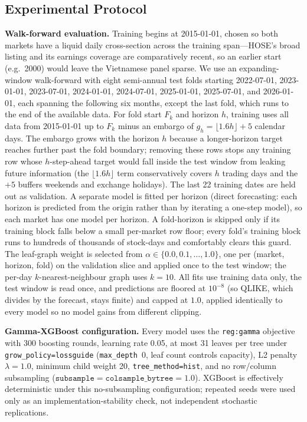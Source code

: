 \documentclass[runningheads,a4paper]{llncs}
\begin{document}
\subsection{Experimental Protocol}
\textbf{Walk-forward evaluation.} Training begins at 2015-01-01, chosen so both markets have a liquid daily
cross-section across the training span---HOSE's broad listing and its earnings coverage are comparatively
recent, so an earlier start (e.g.\ 2000) would leave the Vietnamese panel sparse. We use an expanding-window walk-forward
with eight semi-annual test folds starting 2022-07-01, 2023-01-01, 2023-07-01, 2024-01-01, 2024-07-01,
2025-01-01, 2025-07-01, and 2026-01-01, each spanning the following six months, except the last fold, which runs to the end of the available data. For fold start $F_k$ and
horizon $h$, training uses all data from 2015-01-01 up to $F_k$ minus an embargo of
$g_h=\lfloor 1.6h\rfloor+5$ calendar days. The embargo grows with the horizon $h$ because a longer-horizon
target reaches further past the fold boundary; removing these rows stops any training row whose
$h$-step-ahead target would fall inside the test window from leaking future information (the
$\lfloor 1.6h\rfloor$ term conservatively covers $h$ trading days and the $+5$ buffers weekends and exchange
holidays). The last 22 training dates are held out as validation. A
separate model is fitted per horizon (direct forecasting: each horizon is predicted from the origin
rather than by iterating a one-step model), so each market has one model per horizon. A fold-horizon is
skipped only if its training block falls below a small per-market row floor; every fold's training block
runs to hundreds of thousands of stock-days and comfortably clears this guard. The leaf-graph weight is selected from
$\alpha\in\{0.0,0.1,\dots,1.0\}$, one per (market, horizon, fold) on the validation slice and applied once
to the test window; the per-day $k$-nearest-neighbour graph uses $k=10$. All fits use training data only,
the test window is read once, and predictions are floored at $10^{-8}$ (so QLIKE, which divides by the
forecast, stays finite) and capped at $1.0$, applied identically to every model so no model gains from
different clipping.

\textbf{Gamma-XGBoost configuration.} Every model uses the \texttt{reg:gamma} objective with 300 boosting
rounds, learning rate 0.05, at most 31 leaves per tree under \texttt{grow\_policy=lossguide}
(\texttt{max\_depth}~0, leaf count controls capacity), L2 penalty $\lambda=1.0$, minimum child weight 20,
\texttt{tree\_method=hist}, and no row/column subsampling
($\texttt{subsample}=\texttt{colsample\_bytree}=1.0$). XGBoost is effectively deterministic under this
no-subsampling configuration; repeated seeds were used only as an implementation-stability
check, not independent stochastic replications.
\end{document}
